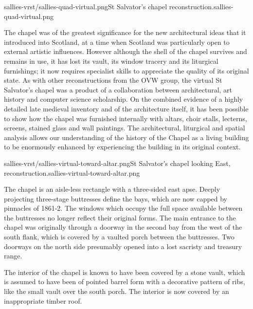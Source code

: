        {sallies-vrst/sallies-quad-virtual.png}{St Salvator's chapel reconstruction.}{sallies-quad-virtual.png}
       
The chapel was of the greatest significance for the new architectural ideas that it introduced into Scotland, at a time when Scotland was particularly open to external artistic influences. However although the shell of the chapel survives and remains in use, it has lost its vault, its window tracery and its liturgical furnishings; it now requires specialist skills to appreciate the quality of its original state. As with other reconstructions from the OVW group, the virtual St Salvator's chapel was a product of a collaboration between architectural, art history and computer science scholarship. On the combined evidence of a highly detailed late medieval inventory and of the architecture itself, it has been possible to show how the chapel was furnished internally with altars, choir stalls, lecterns, screens, stained glass and wall paintings. The architectural, liturgical and spatial analysis allows our understanding of the history of the Chapel as a living building to be enormously enhanced by experiencing the building in its original context.

       {sallies-vrst/sallies-virtual-toward-altar.png}{St Salvator's chapel looking East, reconstruction.}{sallies-virtual-toward-altar.png}

The chapel is an aisle-less rectangle with a three-sided east apse. Deeply projecting three-stage buttresses define the bays, which are now capped by pinnacles of 1861-2. The windows which occupy the full space available between the buttresses no longer reflect their original forms. The main entrance to the chapel was originally through a doorway in the second bay from the west of the south flank, which is covered by a vaulted porch between the buttresses. Two doorways on the north side presumably opened into a lost sacristy and treasury range.

The interior of the chapel is known to have been covered by a stone vault, which is assumed to have been of pointed barrel form with a decorative pattern of ribs, like the small vault over the south porch. The interior is now covered by an inappropriate timber roof.

